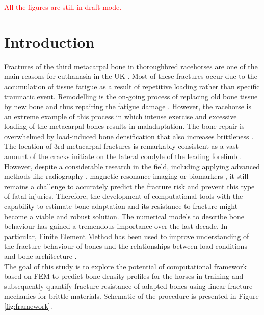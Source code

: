 \documentclass[11pt]{acmeArticle}
\numberwithin{equation}{section}
\begin{document}
\textcolor{red}{All the figures are still in draft mode.}
\section{Introduction}
Fractures of the third metacarpal bone in thoroughbred racehorses are one of the main reasons for euthanasia in the UK \citep{Parkin2004risk}. Most of these fractures occur due to the accumulation of tissue fatigue as a result of repetitive loading \citep{Parkin2005} rather than specific traumatic event. Remodelling is the on-going process of replacing old bone tissue by new bone and thus repairing the fatigue damage \citep{hughes2017role}. However, the racehorse is an extreme example of this process in which intense exercise and excessive loading of the metacarpal bones results in maladaptation. The bone repair is overwhelmed by load-induced bone densification that also increases brittleness \citep{loughridge2017qualitative}. The location of 3rd metacarpal fractures is remarkably consistent as a vast amount of the cracks initiate on the lateral condyle of the leading forelimb \citep{jacklin2012frequency, parkin2006analysis}. However, despite a considerable research in the field, including applying advanced methods like radiography \citep{crijns2014intramodality, loughridge2017qualitative, bogers2016quantitative}, magnetic resonance imaging \citep{tranquille2017MRI} or biomarkers \citep{mcilwraith2005use}, it still remains a challenge to accurately predict the fracture risk and prevent this type of fatal injuries. Therefore, the development of computational tools with the capability to estimate bone adaptation and its resistance to fracture might become a viable and robust solution. The numerical models to describe bone behaviour has gained a tremendous importance over the last decade. In particular, Finite Element Method has been used to improve understanding of the fracture behaviour of bones and the relationships between load conditions and bone architecture \citep{podshivalov2014road, poelert2013patient}. \\
The goal of this study is to explore the potential of computational framework based on FEM to predict bone density profiles for the horses in training and subsequently quantify fracture resistance of adapted bones using linear fracture mechanics for brittle materials. Schematic of the procedure is presented in Figure \ref{fig:framework}.
\end{document}
